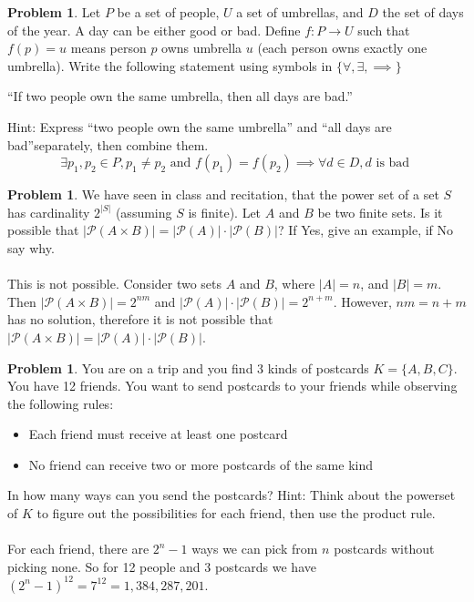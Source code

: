 \documentclass[10pt,leqno ]{article}
\theoremstyle{definition}
\newtheorem{problem}[theorem]{Problem}
\begin{document}
\begin{problem} Let $P$ be a set of people, $U$ a set of umbrellas, and $D$ the set of days of the year.  A day can be either good or bad.  Define $f:P \to U$ such that $f(p) =u$ means person $p$ owns umbrella $u$ (each person owns exactly one umbrella).  Write the following statement using symbols in $\{\forall,\exists,\implies\}$
\begin{center}
“If two people own the same umbrella, then all days are bad.”
\end{center}
Hint: Express “two people own the same umbrella” and “all days are bad”separately, then combine them.
\Large
$$ \exists p_1, p_2 \in P,  p_1 \neq p_2 \text{ and } f(p_1) = f(p_2)  \implies \forall d \in D, d \text{ is bad }$$
\end{problem}
\newpage

\begin{problem} We have seen in class and recitation, that the power set of a set $S$ has cardinality $2^{|S|}$ (assuming $S$ is finite).  Let $A$ and $B$ be two finite sets.  Is it possible that $|\mathcal{P}(A \times B)|=|\mathcal{P}(A)|\cdot|\mathcal{P}(B)|$?  If Yes, give an example, if No say why.
\\\\
\Large
This is not possible.  Consider two sets $A$ and $B$, where $|A| = n$, and $|B| = m$.  Then $|\mathcal{P}(A \times B)| = 2^{nm}$ and $|\mathcal{P}(A)| \cdot |\mathcal{P}(B)| = 2^{n+m}$.  However, $nm = n+m$ has no solution, therefore it is not possible that $|\mathcal{P}(A \times B)|=|\mathcal{P}(A)|\cdot|\mathcal{P}(B)|$.
\end{problem}
\newpage

\begin{problem} You are on a trip and you find 3 kinds of postcards $K=\{A, B, C\}$.  You have 12 friends.  You want to send postcards to your friends while observing the following rules:
\begin{itemize}
\item Each friend must receive at least one postcard\\
\item No friend can receive two or more postcards of the same kind
\end{itemize}
In how many ways can you send the postcards?  Hint:  Think about the powerset of $K$ to figure out the possibilities for each friend, then use the product rule.
\Large
\\\\
For each friend, there are $2^n-1$ ways we can pick from $n$ postcards without picking none.  So for 12 people and 3 postcards we have $(2^n-1)^{12} = 7^{12} = 1,384,287,201$.
\end{problem}
\newpage
\end{document}
